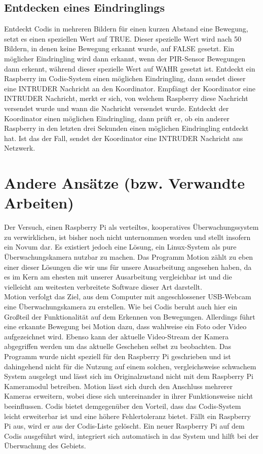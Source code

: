 \documentclass[journal]{IEEEtran}
\begin{document}
\subsection{Entdecken eines Eindringlings}

Entdeckt Codis in mehreren Bildern für einen kurzen Abstand eine Bewegung, setzt es einen speziellen Wert auf TRUE. Dieser spezielle Wert wird nach 50 Bildern, in denen keine Bewegung erkannt wurde, auf FALSE gesetzt. Ein möglicher Eindringling wird dann erkannt, wenn der PIR-Sensor Bewegungen dann erkennt, während dieser spezielle Wert auf WAHR gesetzt ist. Entdeckt ein Raspberry im Codis-System einen möglichen Eindringling, dann sendet dieser eine \MakeUppercase{intruder} Nachricht an den Koordinator. Empfängt der Koordinator eine \MakeUppercase{intruder} Nachricht, merkt er sich, von welchem Raspberry diese Nachricht versendet wurde und wann die Nachricht versendet wurde. Entdeckt der Koordinator einen möglichen Eindringling, dann prüft er, ob ein anderer Raspberry in den letzten drei Sekunden einen möglichen Eindringling entdeckt hat. Ist das der Fall, sendet der Koordinator eine \MakeUppercase{intruder} Nachricht ans Netzwerk.

\section{Andere Ansätze (bzw. Verwandte Arbeiten)}
Der Versuch, einen Raspberry Pi als verteiltes, kooperatives Überwachungssystem zu verwirklichen, ist bisher noch nicht unternommen worden und stellt insofern ein Novum dar. Es existiert jedoch eine Lösung, ein Linux-System als pure Überwachungskamera nutzbar zu machen. Das Programm Motion \cite{motion} zählt zu eben einer dieser Lösungen die wir uns für unsere Ausarbeitung angesehen haben, da es im Kern am ehesten mit unserer Ausarbeitung vergleichbar ist und die vielleicht am weitesten verbreitete Software dieser Art darstellt. \\Motion verfolgt das Ziel, aus dem Computer mit angeschlossener USB-Webcam eine Überwachungskamera zu erstellen. Wie bei Codis beruht auch hier ein Großteil der Funktionalität auf dem Erkennen von Bewegungen. Allerdings führt eine erkannte Bewegung bei Motion dazu, dass wahlweise ein Foto oder Video aufgezeichnet wird. Ebenso kann der aktuelle Video-Stream der Kamera abgegriffen werden um das aktuelle Geschehen selbst zu beobachten. Das Programm wurde nicht speziell für den Raspberry Pi geschrieben und ist dahingehend nicht für die Nutzung auf einem solchen, vergleichsweise schwachem System ausgelegt und lässt sich im Originalzustand nicht mit dem Raspberry Pi Kameramodul betreiben. Motion lässt sich durch den Anschluss mehrerer Kameras erweitern, wobei diese sich untereinander in ihrer Funktionsweise nicht beeinflussen. Codis bietet demgegenüber den Vorteil, dass das Codis-System leicht erweiterbar ist und eine höhere Fehlertoleranz bietet. Fällt ein Raspberry Pi aus, wird er aus der Codis-Liste gelöscht. Ein neuer Raspberry Pi auf dem Codis ausgeführt wird, integriert sich automatisch in das System und hilft bei der Überwachung des Gebiets.
\end{document}
